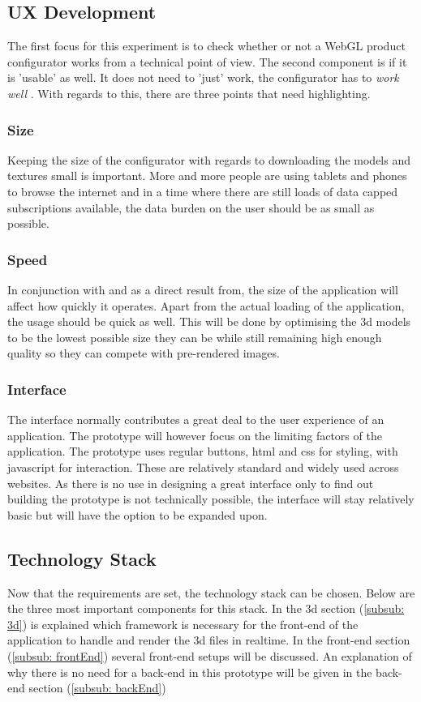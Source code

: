 \subsection{UX Development}
The first focus for this experiment is to check whether or not a WebGL product configurator works from a technical point of view. The second component is if it is 'usable' as well. It does not need to 'just' work, the configurator has to \textit{work well} . With regards to this, there are three points that need highlighting.
\subsubsection{Size}
Keeping the size of the configurator with regards to downloading the models and textures small is important. More and more people are using tablets and phones to browse the internet and in a time where there are still loads of data capped subscriptions available, the data burden on the user should be as small as possible.

\subsubsection{Speed}
In conjunction with and as a direct result from, the size of the application will affect how quickly it operates. Apart from the actual loading of the application, the usage should be quick as well. This will be done by optimising the 3d models to be the lowest possible size they can be while still remaining high enough quality so they can compete with pre-rendered images.

\subsubsection{Interface}
The interface normally contributes a great deal to the user experience of an application. The prototype will however focus on the limiting factors of the application. The prototype uses regular buttons, html and css for styling, with javascript for interaction. These are relatively standard and widely used across websites. As there is no use in designing a great interface only to find out building the prototype is not technically possible, the interface will stay relatively basic but will have the option to be expanded upon.

\subsection{Technology Stack}
Now that the requirements are set, the technology stack can be chosen. Below are the three most important components for this stack. In the 3d section (\ref{subsub: 3d}) is explained which framework is necessary for the front-end of the application to handle and render the 3d files in realtime. In the front-end section (\ref{subsub: frontEnd}) several front-end setups will be discussed. An explanation of why there is no need for a back-end in this prototype will be given in the back-end section (\ref{subsub: backEnd})

